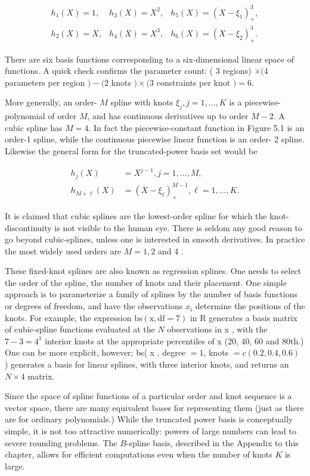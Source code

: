 \documentclass[10pt]{article}
\begin{document}
\[
\begin{array}{lll}
h_{1}(X)=1, & h_{3}(X)=X^{2}, & h_{5}(X)=\left(X-\xi_{1}\right)_{+}^{3},  \tag{5.3}\\
h_{2}(X)=X, & h_{4}(X)=X^{3}, & h_{6}(X)=\left(X-\xi_{2}\right)_{+}^{3} .
\end{array}
\]

There are six basis functions corresponding to a six-dimensional linear space of functions. A quick check confirms the parameter count: ( 3 regions) $\times(4$ parameters per region $)-(2$ knots $) \times(3$ constraints per knot $)=6$.

More generally, an order- $M$ spline with knots $\xi_{j}, j=1, \ldots, K$ is a piecewise-polynomial of order $M$, and has continuous derivatives up to order $M-2$. A cubic spline has $M=4$. In fact the piecewise-constant function in Figure 5.1 is an order-1 spline, while the continuous piecewise linear function is an order- 2 spline. Likewise the general form for the truncated-power basis set would be

$$
\begin{aligned}
h_{j}(X) & =X^{j-1}, j=1, \ldots, M, \\
h_{M+\ell}(X) & =\left(X-\xi_{\ell}\right)_{+}^{M-1}, \ell=1, \ldots, K .
\end{aligned}
$$

It is claimed that cubic splines are the lowest-order spline for which the knot-discontinuity is not visible to the human eye. There is seldom any good reason to go beyond cubic-splines, unless one is interested in smooth derivatives. In practice the most widely used orders are $M=1,2$ and 4 .

These fixed-knot splines are also known as regression splines. One needs to select the order of the spline, the number of knots and their placement. One simple approach is to parameterize a family of splines by the number of basis functions or degrees of freedom, and have the observations $x_{i}$ determine the positions of the knots. For example, the expression $\mathrm{bs}(\mathrm{x}, \mathrm{df}=7)$ in R generates a basis matrix of cubic-spline functions evaluated at the $N$ observations in x , with the $7-3=4^{1}$ interior knots at the appropriate percentiles of x (20, 40, 60 and 80th.) One can be more explicit, however; bs( x , degree $=1$, knots $=c(0.2,0.4,0.6)$ ) generates a basis for linear splines, with three interior knots, and returns an $N \times 4$ matrix.

Since the space of spline functions of a particular order and knot sequence is a vector space, there are many equivalent bases for representing them (just as there are for ordinary polynomials.) While the truncated power basis is conceptually simple, it is not too attractive numerically: powers of large numbers can lead to severe rounding problems. The $B$-spline basis, described in the Appendix to this chapter, allows for efficient computations even when the number of knots $K$ is large.
\end{document}
